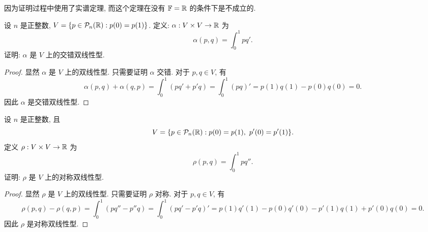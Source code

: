 \documentclass{article}
\begin{document}
\begin{solution}
  因为证明过程中使用了实谱定理, 而这个定理在没有 \( \mathbb{F}=\mathbb{R} \) 的条件下是不成立的.
\end{solution}



\begin{problem}[9A-9]
  设 \( n \) 是正整数, \( V=\{p\in \mathcal{P}_n(\mathbb{R}) :p(0)=p(1)\} \). 定义: \( \alpha: V\times V\to \mathbb{R} \) 为
  \[ \alpha(p,q)=\int_{0}^{1}pq'. \]
  证明: \( \alpha \) 是 \( V \) 上的交错双线性型.
\end{problem}

\begin{proof}
  显然 \( \alpha \) 是 \( V \) 上的双线性型. 只需要证明 \( \alpha \) 交错. 对于 \( p,q\in V \), 有
  \[ \alpha(p,q)+\alpha(q,p) = \int_{0}^{1} (pq'+p'q) = \int_{0}^{1} (pq)' = p(1)q(1)-p(0)q(0) = 0. \]
  因此 \( \alpha \) 是交错双线性型.
\end{proof}



\begin{problem}[9A-10]
  设 \( n \) 是正整数, 且
  \[ V=\{p\in \mathcal{P}_n(\mathbb{R}): p(0)=p(1),\ p'(0)=p'(1)\}. \]
  定义 \( \rho: V\times V\to\mathbb{R} \) 为
  \[ \rho(p,q)=\int_{0}^{1}pq''. \]
  证明: \( \rho \) 是 \( V \) 上的对称双线性型.
\end{problem}

\begin{proof}
  显然 \( \rho \) 是 \( V \) 上的双线性型. 只需要证明 \( \rho \) 对称. 对于 \( p,q\in V \), 有
  \[ \rho(p,q)-\rho(q,p) = \int_{0}^{1} (pq''-p''q) = \int_{0}^{1} (pq'-p'q)' = p(1)q'(1)-p(0)q'(0)-p'(1)q(1)+p'(0)q(0) = 0. \]
  因此 \( \rho \) 是对称双线性型.
\end{proof}
\end{document}
